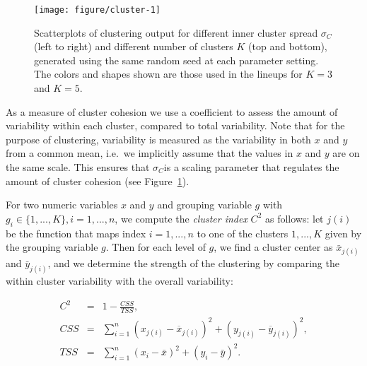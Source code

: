 \documentclass[12pt]{article}\usepackage[]{graphicx}\usepackage[]{color}
\newenvironment{knitrout}{}{} %
\begin{document}
\begin{figure}[bht]
\begin{knitrout}
\color{fgcolor}

{\centering \texttt{[image: figure/cluster-1]} 

}



\end{knitrout}
\caption[Parameters affecting $M_C$]{\label{fig:clusters} Scatterplots of clustering output for different inner cluster spread $\sigma_C$  (left to right) and different number of clusters $K$ (top and bottom), generated using the same random seed at each parameter setting. The colors and shapes shown are those used in the lineups for $K=3$ and $K=5$.}
\end{figure}
As a measure of cluster cohesion we use a coefficient to assess the amount of variability within each cluster, compared to total variability. Note that for the purpose of clustering, variability is measured as the variability in both $x$ and $y$ from a common mean, i.e.\ we implicitly assume that the values in $x$ and $y$ are on the same scale. This ensures that $\sigma_C$is a scaling parameter that regulates the amount of cluster cohesion (see Figure~\ref{fig:clusters}).  %




For two numeric variables $x$ and $y$ and grouping variable $g$ with $g_i \in \{1, ..., K\}, i = 1, ..., n$, we compute the  {\it cluster index} $C^2$ as follows: let $j(i)$ be the function that maps index $i = 1, ..., n$ to one of the clusters $1, ..., K$ given by the grouping variable $g$. Then for each  level of $g$, we find  a cluster center as $\bar{x}_{j(i)}$ and  $\bar{y}_{j(i)}$, and we determine the strength of the clustering by comparing the within cluster variability with the overall variability: 

\begin{eqnarray}\label{eq:clusterMeasure}
C^2 &=& 1 - \frac{CSS}{TSS},\\
\nonumber CSS &=& \sum_{i=1}^n \left(x_{j(i)} - \overline{x}_{j(i)}\right)^2 + \left(y_{j(i)} - \overline{y}_{j(i)} \right)^2, \\
\nonumber TSS &=& \sum_{i=1}^n \left(x_i - \bar{x}\right)^2 + \left(y_i - \bar{y}\right)^2.
\end{eqnarray}
\end{document}
